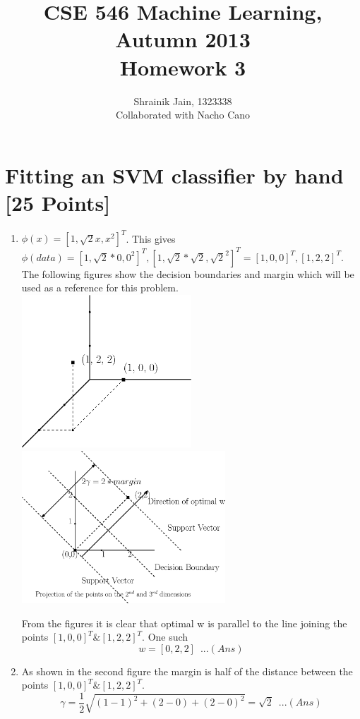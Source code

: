 \documentclass[letterpaper]{article}
\title{CSE 546 Machine Learning, Autumn 2013 \\ Homework 3}
\date{Shrainik Jain, 1323338 \\ Collaborated with Nacho Cano}
\begin{document}
\maketitle


\section{Fitting an SVM classifier by hand [25 Points]}
\begin{enumerate}
\item $\phi(x) = [1, \sqrt{2}x,x^2]^T$. This gives $\phi(data) = [1, \sqrt{2}*0, 0^2]^T , [1, \sqrt{2}*\sqrt{2}, \sqrt{2}^2]^T = [1, 0, 0]^T, [1, 2, 2]^T$. The following figures show the decision boundaries and margin which will be used as a reference for this problem.\\
\includegraphics[width = 2.5in,keepaspectratio]{HW3_figure1.eps}
\includegraphics[width = 3in, keepaspectratio]{HW3_figure2.eps}

From the figures it is clear that optimal w is parallel to the line joining the points $[1, 0, 0]^T  \&  [1, 2, 2]^T$. One such
\begin{equation}
 w = [0, 2, 2] \,\,\, ...(Ans)
\end{equation}

\item As shown in the second figure the margin is half of the distance between the points $[1, 0, 0]^T  \&  [1, 2, 2]^T$.
\begin{equation}
\gamma = \frac{1}{2}\sqrt{(1-1)^2 + (2-0) + (2-0)^2} = \sqrt{2} \,\,\, ...(Ans)
\end{equation}


\end{enumerate}
\end{document}

